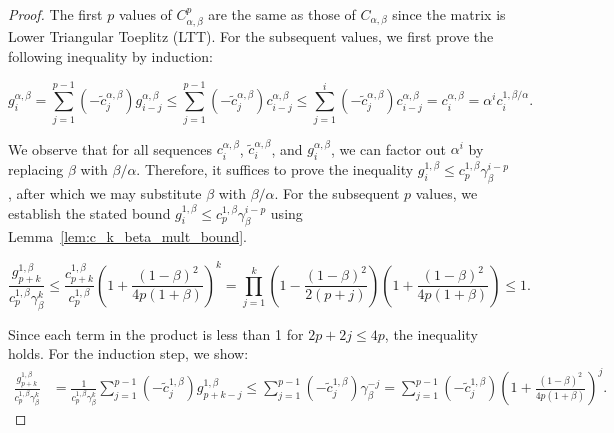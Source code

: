 \documentclass{article} %
\begin{document}
\begin{proof}
The first $p$ values of $C_{\alpha, \beta}^{p}$ are the same as those of $C_{\alpha, \beta}$ since the matrix is Lower Triangular Toeplitz (LTT). For the subsequent values, we first prove the following inequality by induction:

\begin{equation}
    g_i^{\alpha, \beta} = \sum\limits_{j = 1}^{p - 1} (-\tilde{c}_{j}^{\alpha, \beta})g_{i - j}^{\alpha, \beta} \le \sum\limits_{j = 1}^{p - 1} (-\tilde{c}_{j}^{\alpha, \beta})c_{i - j}^{\alpha, \beta} \le \sum\limits_{j = 1}^{i} (-\tilde{c}_{j}^{\alpha, \beta})c_{i - j}^{\alpha, \beta} = c_{i}^{\alpha, \beta} = \alpha^i c_i^{1, \beta/\alpha}.
\end{equation}

We observe that for all sequences $c_i^{\alpha, \beta}$, $\tilde{c}_i^{\alpha, \beta}$, and $g_i^{\alpha, \beta}$, we can factor out $\alpha^i$ by replacing $\beta$ with $\beta/\alpha$. Therefore, it suffices to prove the inequality $g_i^{1, \beta} \le c_{p}^{1, \beta} \gamma_{\beta}^{i - p}$, after which we may substitute $\beta$ with $\beta/\alpha$. For the subsequent $p$ values, we establish the stated bound $g_i^{1, \beta} \le c_{p}^{1, \beta} \gamma_{\beta}^{i - p}$ using Lemma~\ref{lem:c_k_beta_mult_bound}.



\begin{equation}
    \frac{g^{1, \beta}_{p + k}}{c_p^{1, \beta} \gamma_{\beta}^k} \le \frac{c^{1, \beta}_{p + k}}{c_p^{1, \beta}} \left(1 + \frac{(1 - \beta)^2}{4p (1 + \beta)}\right)^k = \prod_{j = 1}^{k} \left(1 - \frac{(1 - \beta)^2}{2(p + j)}\right) \left(1 + \frac{(1 - \beta)^2}{4p(1 + \beta)}\right) \le 1.
\end{equation}

Since each term in the product is less than 1 for $2p + 2j \le 4p$, the inequality holds. For the induction step, we show:
%
\begin{equation}
\begin{aligned}
    \frac{g^{1, \beta}_{p +k}}{c^{1, \beta}_p \gamma_{\beta}^k} &= \frac{1}{c^{1, \beta}_p \gamma_{\beta}^k}\sum\limits_{j = 1}^{p - 1}(-\tilde{c}^{1, \beta}_j) g^{1, \beta}_{p + k - j} \le \sum\limits_{j = 1}^{p - 1}(-\tilde{c}^{1, \beta}_j) \gamma_{\beta}^{-j} = \sum\limits_{j = 1}^{p - 1}(-\tilde{c}^{1, \beta}_j) \left(1 + \frac{(1 - \beta)^2}{4p (1 + \beta)}\right)^{j}.
\end{aligned}
\end{equation}


\end{proof}
\end{document}

